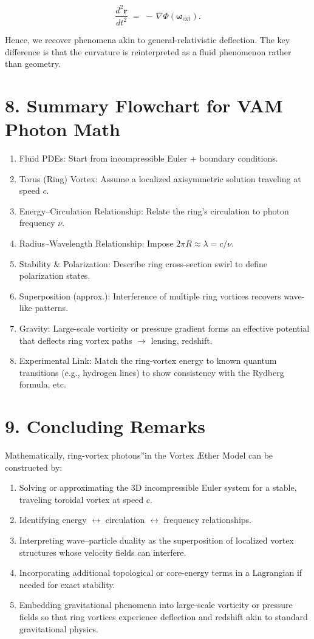 \documentclass[a4paper,12pt]{article}
\begin{document}
\[
 \frac{d^2 \mathbf{r}}{dt^2} \;=\; -\,\nabla \Phi(\boldsymbol{\omega}_{\mathrm{ext}}).
\]

Hence, we recover phenomena akin to general-relativistic deflection. The key difference is that the curvature is reinterpreted as a fluid phenomenon rather than geometry.

\section*{8. Summary Flowchart for VAM Photon Math}
\begin{enumerate}
 \item Fluid PDEs: Start from incompressible Euler + boundary conditions.
 \item Torus (Ring) Vortex: Assume a localized axisymmetric solution traveling at speed \(c\).
 \item Energy–Circulation Relationship: Relate the ring's circulation to photon frequency \(\nu\).
 \item Radius–Wavelength Relationship: Impose \(2\pi R \approx \lambda = c/\nu\).
 \item Stability \& Polarization: Describe ring cross-section swirl to define polarization states.
 \item Superposition (approx.): Interference of multiple ring vortices recovers wave-like patterns.
 \item Gravity: Large-scale vorticity or pressure gradient forms an effective potential that deflects ring vortex paths \(\rightarrow\) lensing, redshift.
 \item Experimental Link: Match the ring-vortex energy to known quantum transitions (e.g., hydrogen lines) to show consistency with the Rydberg formula, etc.
\end{enumerate}

\section*{9. Concluding Remarks}
Mathematically, ring-vortex \grqq photons\textquotedblright in the Vortex Æther Model can be constructed by:

\begin{enumerate}
 \item Solving or approximating the 3D incompressible Euler system for a stable, traveling toroidal vortex at speed \(c\).
 \item Identifying energy \(\leftrightarrow\) circulation \(\leftrightarrow\) frequency relationships.
 \item Interpreting wave–particle duality as the superposition of localized vortex structures whose velocity fields can interfere.
 \item Incorporating additional topological or core-energy terms in a Lagrangian if needed for exact stability.
 \item Embedding gravitational phenomena into large-scale vorticity or pressure fields so that ring vortices experience deflection and redshift akin to standard gravitational physics.
\end{enumerate}
\end{document}
